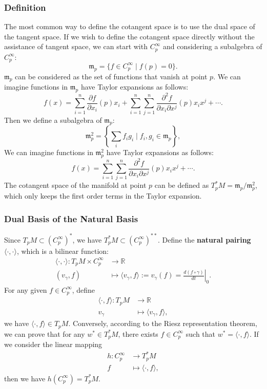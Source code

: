 \documentclass{report}
\begin{document}
\subsubsection{Definition}
The most common way to define the cotangent space is to use the dual space of the tangent space.
If we wish to define the cotangent space directly without the assistance of tangent space, we can start with $C^\infty_p$ and considering a subalgebra of $C^\infty_p$:
\[
    \mathfrak{m}_p=\{f\in C^\infty_p\mid f(p)=0\}.
\]
$\mathfrak{m}_p$ can be considered as the set of functions that vanish at point $p$. We can imagine functions in $\mathfrak{m}_p$ have Taylor expansions as follows:
\[
    f(x)=\sum_{i=1}^n\frac{\partial f}{\partial x_i}(p)x_i+\sum_{i=1}^n\sum_{j=1}^n\frac{\partial^2 f}{\partial x_i\partial x^j}(p)x_ix^j+\cdots.
\] 
Then we define a subalgebra of $\mathfrak{m}_p$:
\[
    \mathfrak{m}^2_p=\left\{\sum_if_ig_i\mid f_i, g_i\in \mathfrak{m}_p\right\},
\]
We can imagine functions in $\mathfrak{m}_p^2$ have Taylor expansions as follows:
\[
    f(x)=\sum_{i=1}^n\sum_{j=1}^n\frac{\partial^2 f}{\partial x_i\partial x^j}(p)x_ix^j+\cdots.
\] 
The cotangent space of the manifold at point $p$ can be defined as $T_p^*M=\mathfrak{m}_p/\mathfrak{m}^2_p$, which only keeps the first order terms in the Taylor expansion.

\subsubsection{Dual Basis of the Natural Basis}
Since $T_pM\subset \left(C^\infty_p\right)^*$, we have $T_p^*M\subset \left(C^\infty_p\right)^{**}$. Define the \textbf{natural pairing} $\langle\cdot,\cdot\rangle$, which is a bilinear function:
\[
    \begin{aligned}
    \langle\cdot,\cdot\rangle:T_pM\times C^\infty_p&\longrightarrow\mathbb{R}\\
    (v_\gamma,f)&\longmapsto\langle v_\gamma,f\rangle:=v_\gamma(f)=\left.\frac{d(f\circ \gamma)}{dt}\right|_{0}.
    \end{aligned}
\]
For any given $f\in C^\infty_p$, define
\[
    \begin{aligned}
        \langle\cdot,f\rangle:T_pM&\longrightarrow\mathbb{R}\\
        v_\gamma&\longmapsto\langle v_\gamma,f\rangle,
    \end{aligned}
\]
we have $\langle\cdot,f\rangle\in T_pM$. Conversely, according to the Riesz representation theorem, we can prove that for any $w^*\in T_p^*M$, there exists $f\in C^\infty_p$ such that $w^*=\langle\cdot,f\rangle$. If we consider the linear mapping
\[
    \begin{aligned}
        h:C^\infty_p&\longrightarrow T_p^*M\\
        f&\longmapsto\langle\cdot,f\rangle,
    \end{aligned}
\]
then we have $h(C^\infty_p)=T_p^*M$.
\end{document}
